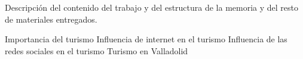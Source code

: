 
Descripción del contenido del trabajo y del estructura de la memoria y del resto de materiales entregados.



Importancia del turismo
Influencia de internet en el turismo
Influencia de las redes sociales en el turismo
Turismo en Valladolid
